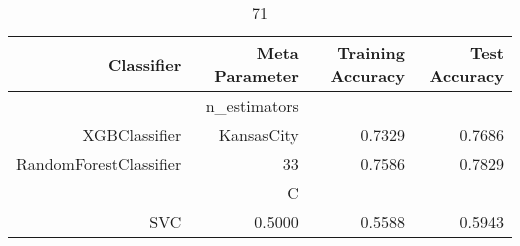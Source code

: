 
\begin{table}[H]
    \caption{71}
    \centering
    \begin{tabular}{|r|r|r|r|}
        \hline
        Classifier &Meta Parameter &Training Accuracy
        &Test Accuracy\\
        \hline
        &n\_estimators &\multicolumn{2}{|r|}{}\\
        \hline
        XGBClassifier &KansasCity &0.7329 &0.7686\\
        \hline
        RandomForestClassifier &33 &0.7586 &0.7829\\
        \hline
        &C &\multicolumn{2}{|r|}{}\\
        \hline
        SVC &0.5000 &0.5588 &0.5943\\
        \hline
    \end{tabular}
\end{table}
